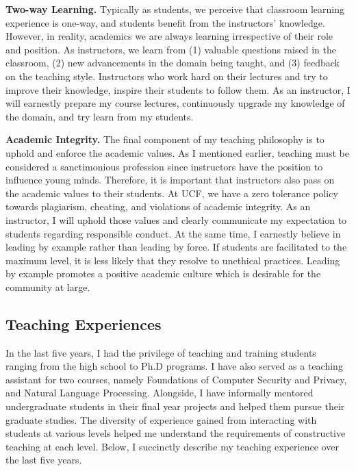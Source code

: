 \documentclass{NSF}
\newcommand{\BfPara}[1]{{\noindent\textbf{#1.}}\xspace}
\begin{document}
\vspace{1mm}
\BfPara{Two-way Learning} Typically as students, we perceive that classroom learning experience is one-way, and students benefit from the instructors' knowledge. However, in reality, academics we are always learning irrespective of their role and position. As instructors, we learn from (1) valuable questions raised in the classroom, (2) new advancements in the domain being taught, and (3) feedback on the teaching style. Instructors who work hard on their lectures and try to improve their knowledge, inspire their students to follow them. As an instructor, I will earnestly prepare my course lectures, continuously upgrade my knowledge of the domain, and try learn from my students. 

\vspace{1mm}
\BfPara{Academic Integrity} The final component of my teaching philosophy is to uphold and enforce the academic values. As I mentioned earlier, teaching must be considered a sanctimonious profession since instructors have the position to influence young minds. Therefore, it is important that instructors also pass on the academic values to their students. At UCF, we have a zero tolerance policy towards plagiarism, cheating, and violations of academic integrity. As an instructor, I will uphold those values and clearly communicate my expectation to students regarding responsible conduct. At the same time, I earnestly believe in leading by example rather than leading by force. If students are facilitated to the maximum level, it is less likely that they resolve to unethical practices. Leading by example promotes a positive academic culture which is desirable for the community at large. 




\subsection*{Teaching Experiences}
In the last five years, I had the privilege of teaching and training students ranging from the high school to Ph.D programs. I have also served as a teaching assistant for two courses, namely Foundations of Computer Security and Privacy, and Natural Language Processing. Alongside, I have informally mentored undergraduate students in their final year projects and helped them pursue their graduate studies. The diversity of experience gained from interacting with students at various levels helped me understand the requirements of constructive teaching at each level. Below, I succinctly describe my teaching experience over the last five years.
\end{document}
